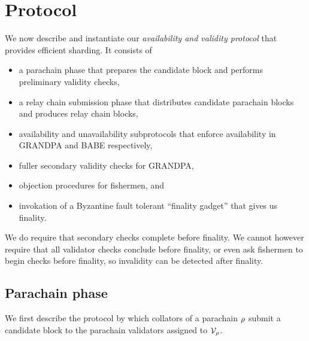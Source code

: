 
\section{Protocol} %
\label{sec:protocol}

We now describe and instantiate our {\em availability and validity protocol} that provides efficient sharding.  It consists of 
\begin{itemize}
\item a parachain phase that prepares the candidate block and performs preliminary validity checks,
\item a relay chain submission phase that distributes candidate parachain blocks and produces relay chain blocks,
\item availability and unavailability subprotocols that enforce availability in GRANDPA and BABE respectively,
\item fuller secondary validity checks for GRANDPA,
\item objection procedures for fishermen, and
\item invokation of a Byzantine fault tolerant ``finality gadget'' that gives us finality.
\end{itemize}

We do require that secondary checks complete before finality.  We cannot however require that all validator checks conclude before finality, or even ask fishermen to begin checks before finality, so invalidity can be detected after finality.



\subsection{Parachain phase} 
\label{sec:parachain}

We first describe the protocol by which collators of a parachain $\rho$ submit a candidate block to the parachain validators assigned to $\mathcal{V}_{\rho}$.

